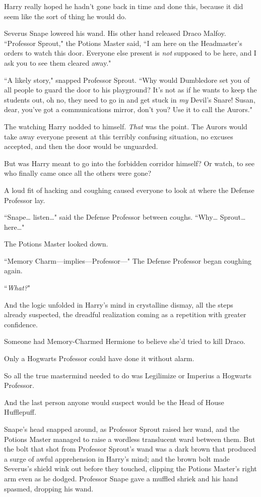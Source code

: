 Harry really hoped he hadn't gone back in time and done this, because it did seem like the sort of thing he would do.

Severus Snape lowered his wand. His other hand released Draco Malfoy. ``Professor Sprout," the Potions Master said, ``I am here on the Headmaster's orders to watch this door. Everyone else present is \emph{not} supposed to be here, and I ask you to see them cleared away."

``A likely story," snapped Professor Sprout. ``Why would Dumbledore set you of all people to guard the door to his playground? It's not as if he wants to keep the students out, oh no, they need to go in and get stuck in \emph{my} Devil's Snare! Susan, dear, you've got a communications mirror, don't you? Use it to call the Aurors."

The watching Harry nodded to himself. \emph{That} was the point. The Aurors would take away everyone present at this terribly confusing situation, no excuses accepted, and then the door would be unguarded.

But was Harry meant to go into the forbidden corridor himself? Or watch, to see who finally came once all the others were gone?

A loud fit of hacking and coughing caused everyone to look at where the Defense Professor lay.

``Snape{\ldots} listen{\ldots}" said the Defense Professor between coughs. ``Why{\ldots} Sprout{\ldots} here{\ldots}"

The Potions Master looked down.

``Memory Charm—implies—Professor—" The Defense Professor began coughing again.

``\emph{What?}"

And the logic unfolded in Harry's mind in crystalline dismay, all the steps already suspected, the dreadful realization coming as a repetition with greater confidence.

Someone had Memory-Charmed Hermione to believe she'd tried to kill Draco.

Only a Hogwarts Professor could have done it without alarm.

So all the true mastermind needed to do was Legilimize or Imperius a Hogwarts Professor.

And the last person anyone would suspect would be the Head of House Hufflepuff.

Snape's head snapped around, as Professor Sprout raised her wand, and the Potions Master managed to raise a wordless translucent ward between them. But the bolt that shot from Professor Sprout's wand was a dark brown that produced a surge of awful apprehension in Harry's mind; and the brown bolt made Severus's shield wink out before they touched, clipping the Potions Master's right arm even as he dodged. Professor Snape gave a muffled shriek and his hand spasmed, dropping his wand.


